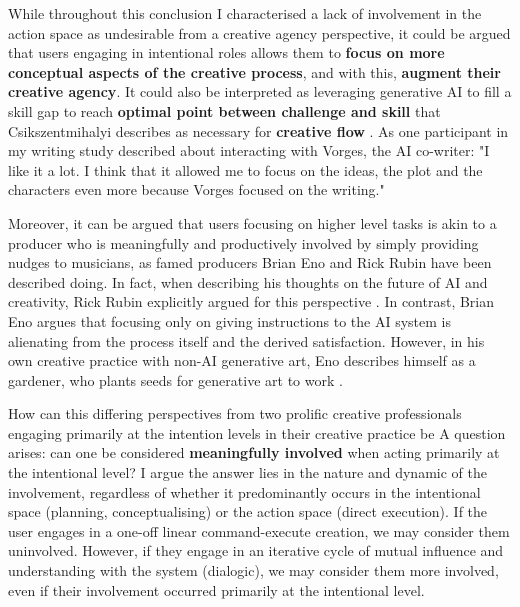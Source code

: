 While throughout this conclusion I characterised a lack of involvement in the action space as undesirable from a creative agency perspective, it could be argued that users engaging in intentional roles allows them to \textbf{focus on more conceptual aspects of the creative process}, and with this, \textbf{augment their creative agency}. It could also be interpreted as leveraging generative AI to fill a skill gap to reach \textbf{optimal point between challenge and skill} that Csikszentmihalyi describes as necessary for \textbf{creative flow} \cite{Csikszentmihalyi1997-ui}. As one participant in my writing study described about interacting with Vorges, the AI co-writer: "I like it a lot. I think that it allowed me to focus on the ideas, the plot and the characters even more because Vorges focused on the writing."

Moreover, it can be argued that users focusing on higher level tasks is akin to a producer who is meaningfully and productively involved by simply providing nudges to musicians, as famed producers Brian Eno and Rick Rubin have been described doing. In fact, when describing his thoughts on the future of AI and creativity, Rick Rubin explicitly argued for this perspective \cite{Rubin2025-sc}. In contrast, Brian Eno argues that focusing only on giving instructions to the AI system is alienating from the process itself and the derived satisfaction. However, in his own creative practice with non-AI generative art, Eno describes himself as a gardener, who plants seeds for generative art to work \cite{Eno2007-fl}. 

How can this differing perspectives from two prolific creative professionals engaging primarily at the intention levels in their creative practice be 
A question arises: can one be considered \textbf{meaningfully involved} when acting primarily at the intentional level? I argue the answer lies in the nature and dynamic of the involvement, regardless of whether it predominantly occurs in the intentional space (planning, conceptualising) or the action space (direct execution). If the user engages in a one-off linear command-execute creation, we may consider them uninvolved. However, if they engage in an iterative cycle of mutual influence and understanding with the system (dialogic), we may consider them more involved, even if their involvement occurred primarily at the intentional level.

